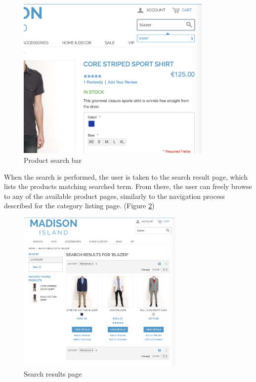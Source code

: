 \vspace{0.5cm}
\begin{figure}[H]
  \centering
    \includegraphics[height=8cm]{images/madison/search.png}
  \caption{Product search bar}
  \label{fig:product-search}
\end{figure}
\vspace{0.5cm}

When the search is performed, the user is taken to the search result page, which lists the products matching searched term. From there, the user can freely browse to any of the available product pages, similarly to the navigation process described for the category listing page. (Figure \ref{fig:search-results})

\vspace{0.5cm}
\begin{figure}[H]
  \centering
    \includegraphics[height=8cm]{images/madison/search-results.png}
  \caption{Search results page}
  \label{fig:search-results}
\end{figure}
\vspace{0.5cm}

